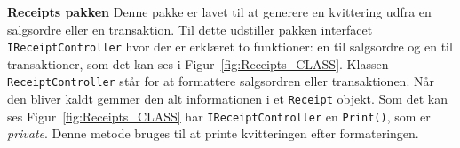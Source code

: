 \textbf{Receipts pakken}
\newline
Denne pakke er lavet til at generere en kvittering udfra en salgsordre eller en transaktion.
Til dette udstiller pakken interfacet \texttt{IReceiptController} hvor der er erklæret to funktioner: en til salgsordre og en til transaktioner, som det kan ses i Figur~\ref{fig:Receipts_CLASS}.
Klassen \texttt{ReceiptController} står for at formattere salgsordren eller transaktionen. Når den bliver kaldt gemmer den alt informationen i et \texttt{Receipt} objekt.
Som det kan ses Figur~\ref{fig:Receipts_CLASS} har \texttt{IReceiptController} en \texttt{Print()}, som er \textit{private}. Denne metode bruges til at printe kvitteringen efter formateringen.

